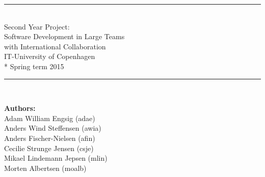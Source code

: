 \begin{titlepage}

\begin{center}


\vspace{67mm}

\rule{\textwidth}{1mm}\\
\vspace*{17mm}
\huge{
Second Year Project: \\ 
Software Development in Large Teams \\
with International Collaboration \\ 
\vspace*{8mm}
IT-University of Copenhagen \\*
Spring term 2015
}
\vspace*{7mm}

\rule{\textwidth}{1mm}\\

\vspace*{19mm}


\begin{Large}
\textbf{Authors:} \\
\vspace*{2mm}
Adam William Engsig  (adae)\\
Anders Wind Steffensen (awia) \\
Anders Fischer-Nielsen (afin) \\
Cecilie Strunge Jensen (csje) \\
Mikael Lindemann Jepsen (mlin) \\
Morten Albertsen (moalb)
\end{Large}
\end{center}
\end{titlepage}
\newpage